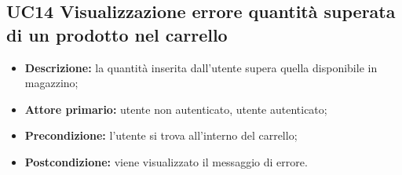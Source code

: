 \subsection{UC14 Visualizzazione errore quantità superata di un prodotto nel carrello}
\label{sec:UC14}
\begin{itemize}
    \item \textbf{Descrizione:} la quantità inserita dall'utente supera quella disponibile in magazzino;
    \item \textbf{Attore primario:} utente non autenticato, utente autenticato;
    \item \textbf{Precondizione:} l'utente si trova all'interno del carrello;
    \item \textbf{Postcondizione:} viene visualizzato il messaggio di errore.
\end{itemize}